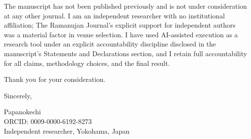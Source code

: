 \documentclass[11pt,a4paper]{article}
\begin{document}
The manuscript has not been published previously and is not under consideration at any other journal. I am an independent researcher with no institutional affiliation; The Ramanujan Journal's explicit support for independent authors was a material factor in venue selection. I have used AI-assisted execution as a research tool under an explicit accountability discipline disclosed in the manuscript's Statements and Declarations section, and I retain full accountability for all claims, methodology choices, and the final result.

Thank you for your consideration.

\vspace{1.5em}
\noindent
Sincerely,

\vspace{2.5em}
\noindent
Papanokechi \\
ORCID: 0009-0000-6192-8273 \\
Independent researcher, Yokohama, Japan
\end{document}
